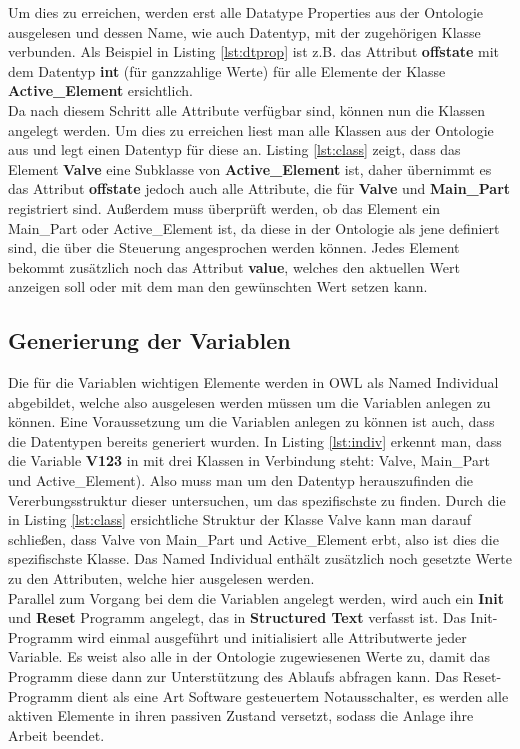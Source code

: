 Um dies zu erreichen, werden erst alle Datatype Properties aus der Ontologie ausgelesen und dessen Name, wie auch Datentyp, mit der zugehörigen Klasse verbunden. Als Beispiel in Listing \ref{lst:dtprop} ist z.B. das Attribut \textbf{offstate} mit dem Datentyp \textbf{int} (für ganzzahlige Werte) für alle Elemente der Klasse \textbf{Active\_Element} ersichtlich.\\

Da nach diesem Schritt alle Attribute verfügbar sind, können nun die Klassen angelegt werden. Um dies zu erreichen liest man alle Klassen aus der Ontologie aus und legt einen Datentyp für diese an. Listing \ref{lst:class} zeigt, dass das Element \textbf{Valve} eine Subklasse von \textbf{Active\_Element} ist, daher übernimmt es das Attribut \textbf{offstate} jedoch auch alle Attribute, die für \textbf{Valve} und \textbf{Main\_Part} registriert sind. Außerdem muss überprüft werden, ob das Element ein Main\_Part oder Active\_Element ist, da diese in der Ontologie als jene definiert sind, die über die Steuerung angesprochen werden können. Jedes Element bekommt zusätzlich noch das Attribut \textbf{value}, welches den aktuellen Wert anzeigen soll oder mit dem man den gewünschten Wert setzen kann.

\subsection{Generierung der Variablen}
Die für die Variablen wichtigen Elemente werden in \ac{OWL} als Named Individual abgebildet, welche also ausgelesen werden müssen um die Variablen anlegen zu können. Eine Voraussetzung um die Variablen anlegen zu können ist auch, dass die Datentypen bereits generiert wurden. In Listing \ref{lst:indiv} erkennt man, dass die Variable \textbf{V123} in mit drei Klassen in Verbindung steht: Valve, Main\_Part und Active\_Element). Also muss man um den Datentyp herauszufinden die Vererbungsstruktur dieser untersuchen, um das spezifischste zu finden. Durch die in Listing \ref{lst:class} ersichtliche Struktur der Klasse Valve kann man darauf schließen, dass Valve von Main\_Part und Active\_Element erbt, also ist dies die spezifischste Klasse. Das Named Individual enthält zusätzlich noch gesetzte Werte zu den Attributen, welche hier ausgelesen werden.\\

Parallel zum Vorgang bei dem die Variablen angelegt werden, wird auch ein \textbf{Init} und \textbf{Reset} Programm angelegt, das in \textbf{Structured Text} verfasst ist. Das Init-Programm wird einmal ausgeführt und initialisiert alle Attributwerte jeder Variable. Es weist also alle in der Ontologie zugewiesenen Werte zu, damit das Programm diese dann zur Unterstützung des Ablaufs abfragen kann. Das Reset-Programm dient als eine Art Software gesteuertem Notausschalter, es werden alle aktiven Elemente in ihren passiven Zustand versetzt, sodass die Anlage ihre Arbeit beendet.

